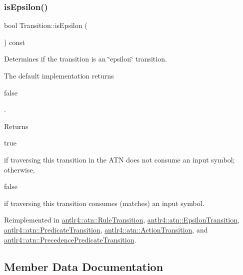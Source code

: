 \subsubsection{\texorpdfstring{is\+Epsilon()}{isEpsilon()}}
{\footnotesize\ttfamily bool Transition\+::is\+Epsilon (\begin{DoxyParamCaption}{ }\end{DoxyParamCaption}) const\hspace{0.3cm}{\ttfamily [virtual]}}

Determines if the transition is an \char`\"{}epsilon\char`\"{} transition.

The default implementation returns
\begin{DoxyCode}
\textcolor{keyword}{false} 
\end{DoxyCode}
 .

\begin{DoxyReturn}{Returns}

\begin{DoxyCode}
\textcolor{keyword}{true} 
\end{DoxyCode}
 if traversing this transition in the A\+TN does not consume an input symbol; otherwise,
\begin{DoxyCode}
\textcolor{keyword}{false} 
\end{DoxyCode}
 if traversing this transition consumes (matches) an input symbol. 
\end{DoxyReturn}


Reimplemented in \hyperlink{classantlr4_1_1atn_1_1RuleTransition_a899ddb9161a918c929cd90371aeec15b}{antlr4\+::atn\+::\+Rule\+Transition}, \hyperlink{classantlr4_1_1atn_1_1EpsilonTransition_aa2ed63d1d7605293c69cd812c6e374ec}{antlr4\+::atn\+::\+Epsilon\+Transition}, \hyperlink{classantlr4_1_1atn_1_1PredicateTransition_a1c43f41d9500f136375cff1d4b7a5d7a}{antlr4\+::atn\+::\+Predicate\+Transition}, \hyperlink{classantlr4_1_1atn_1_1ActionTransition_a995b2814e1d1751f39655f6856572584}{antlr4\+::atn\+::\+Action\+Transition}, and \hyperlink{classantlr4_1_1atn_1_1PrecedencePredicateTransition_a68e686bc0b7ddce9b5fc3f93a763ca52}{antlr4\+::atn\+::\+Precedence\+Predicate\+Transition}.



\subsection{Member Data Documentation}
\mbox{\label{classantlr4_1_1atn_1_1Transition_a891b08e421df76b8a19c9d6ac6f54ddc}} 
